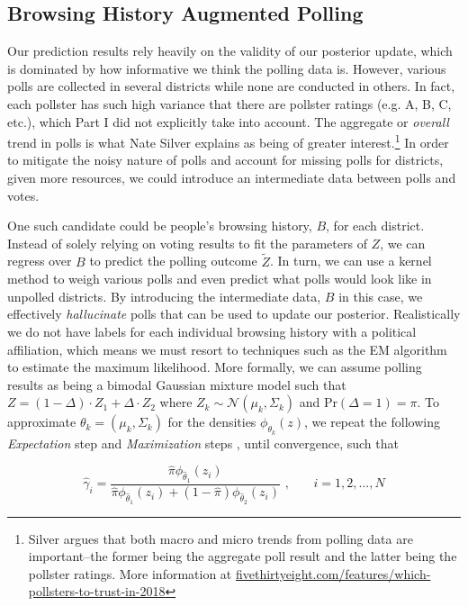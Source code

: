 \documentclass[12pt]{article}
\begin{document}
\subsection{Browsing History Augmented Polling}
Our prediction results rely heavily on the validity of our posterior update, which is dominated by how informative we think the polling data is. However, various polls are collected in several districts while none are conducted in others. In fact, each pollster has such high variance that there are pollster ratings (e.g. A, B, C, etc.), which Part I did not explicitly take into account. The aggregate or \textit{overall} trend in polls is what Nate Silver explains as being of greater interest.\footnote{Silver argues that both macro and micro trends from polling data are important--the former being the aggregate poll result and the latter being the pollster ratings. More information at \url{fivethirtyeight.com/features/which-pollsters-to-trust-in-2018}} In order to mitigate the noisy nature of polls and account for missing polls for districts, given more resources, we could introduce an intermediate data between polls and votes.

One such candidate could be people's browsing history, $B$, for each district. Instead of solely relying on voting results to fit the parameters of $Z$, we can regress over $B$ to predict the polling outcome $\tilde{Z}$. In turn, we can use a kernel method to weigh various polls and even predict what polls would look like in unpolled districts. By introducing the intermediate data, $B$ in this case, we effectively \textit{hallucinate} polls that can be used to update our posterior. Realistically we do not have labels for each individual browsing history with a political affiliation, which means we must resort to techniques such as the EM algorithm to estimate the maximum likelihood. More formally, we can assume polling results as being a bimodal Gaussian mixture model such that $Z = (1 - \Delta) \cdot Z_1 + \Delta \cdot Z_2$ where $Z_k \sim \mathcal{N}(\mu_k, \Sigma_k)$ and Pr$(\Delta = 1) = \pi$. To approximate $\theta_k = (\mu_k, \Sigma_k)$ for the densities $\phi_{\theta_k}(z)$, we repeat the following \textit{Expectation} step  and \textit{Maximization} steps ,  until convergence, such that

\begin{equation}
\hat{\gamma}_i = \frac{\hat{\pi}\phi_{\hat{\theta}_1}(z_i)}{\hat{\pi}\phi_{\hat{\theta}_1}(z_i) + (1-\hat{\pi})\phi_{\hat{\theta}_2}(z_i)} \text{\ ,} \qquad i = 1,2,..., N
\label{eq:expectation}
\end{equation}
\end{document}

